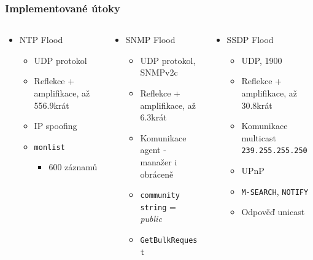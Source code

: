 \documentclass[%
12pt,       				%
t,                  %
aspectratio=1610,   %
unicode,						%
czech,              %
]{beamer}				    	%
\begin{document}
\begin{frame}
\frametitle{Implementované útoky}

\begin{columns}[T] 								%
\begin{column}{0.333333333\textwidth}		%
	\begin{itemize}
		\item NTP Flood
		\begin{itemize}
			\item UDP protokol
			\item Reflekce + amplifikace, až 556.9krát
			\item IP spoofing
			\item \texttt{monlist}
			\begin{itemize}
				\item 600 záznamů
			\end{itemize}
		\end{itemize}
	\end{itemize}
\end{column}
%
\begin{column}{0.333333333\textwidth}		%
	\begin{itemize}
		\item SNMP Flood
		\begin{itemize}
			\item UDP protokol, SNMPv2c
			\item Reflekce + amplifikace, až 6.3krát
			\item Komunikace \\agent - manažer i obráceně
			\item \texttt{community	string} = \textit{public}
			\item \texttt{GetBulkRequest}
		\end{itemize}
	\end{itemize}
\end{column}
%
\begin{column}{0.333333333\textwidth}		%
	\begin{itemize}
		\item SSDP Flood
		\begin{itemize}
			\item UDP, 1900
			\item Reflekce + amplifikace, až 30.8krát
			\item Komunikace multicast \texttt{239.255.255.250}
			\item UPnP
			\item \texttt{M-SEARCH}, \texttt{NOTIFY}
			\item Odpověď unicast
		\end{itemize}
	\end{itemize}
\end{column}
\end{columns}											%
\end{frame}
\end{document}

